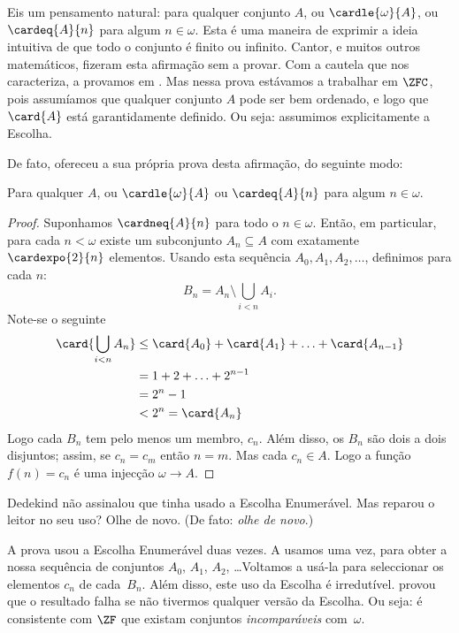\documentclass[../../../include/open-logic-section]{subfiles}
\begin{document}
\begin{ex}
Eis um pensamento natural: para qualquer conjunto $A$, ou
$\cardle{\omega}{A}$, ou $\cardeq{A}{n}$ para algum $n \in \omega$. Esta é
uma maneira de exprimir a ideia intuitiva de que todo o conjunto é
finito ou infinito. Cantor, e muitos outros matemáticos, fizeram esta
afirmação sem a provar. Com a cautela que nos caracteriza, a provamos em
. Mas
nessa prova estávamos a trabalhar em $\ZFC$, pois assumíamos que
qualquer conjunto $A$ pode ser bem ordenado, e logo que $\card{A}$ está
garantidamente definido. Ou seja: assumimos explicitamente a Escolha.

De fato, \citet{Dedekind1888} ofereceu a sua própria prova desta
afirmação, do seguinte modo:

\begin{thm}
Para qualquer $A$, ou $\cardle{\omega}{A}$ ou $\cardeq{A}{n}$ para algum
$n \in \omega$.
\end{thm}

\begin{proof}
Suponhamos $\cardneq{A}{n}$ para todo o $n \in \omega$. Então, em particular,
para cada $n < \omega$ existe um subconjunto $A_n \subseteq A$ com exatamente
$\cardexpo{2}{n}$ elementos. Usando esta sequência $A_0, A_1, A_2,
\ldots$, definimos para cada $n$:
\[
	B_n = A_n \setminus \bigcup_{i < n} A_i.
\]
Note-se o seguinte
\begin{align*}
	\card{\bigcup_{i < n}A_n} 
	&\leq \card{A_0} + \card{A_1} + \ldots + \card{A_{n-1}}\\
	&=1 + 2 + \ldots + 2^{n-1}\\
	& = 2^n - 1\\
	& < 2^n = \card{A_n}
\end{align*}
Logo cada $B_n$ tem pelo menos um membro, $c_n$. Além disso, os $B_n$ são
dois a dois disjuntos; assim, se $c_n = c_m$ então $n = m$. Mas cada $c_n
\in A$. Logo a função $f(n) = c_n$ é uma injecção $\omega \to A$.
\end{proof}
\noindent 
Dedekind não assinalou que tinha usado a Escolha Enumerável. Mas reparou o leitor
no seu uso? Olhe de novo. (De fato: \emph{olhe de novo}.)

A prova usou a Escolha Enumerável duas vezes. A usamos uma vez, para obter
a nossa sequência de conjuntos $A_0$, $A_1$, $A_2$, \dots\@ Voltamos a usá-la
para seleccionar os elementos $c_n$ de cada~$B_n$. Além disso, este uso
da Escolha é irredutível. \citet[p.~138]{Cohen1966} provou que o
resultado falha se não tivermos qualquer versão da Escolha. Ou seja: é
consistente com $\ZF$ que existam conjuntos \emph{incomparáveis} com~$\omega$.
\end{ex}
\end{document}
